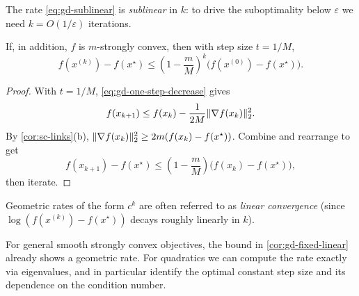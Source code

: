 The rate \eqref{eq:gd-sublinear} is \emph{sublinear} in $k$: to drive the suboptimality below $\varepsilon$ we need $k=O(1/\varepsilon)$ iterations.

\begin{corollary}
\label{cor:gd-fixed-linear}
If, in addition, $f$ is $m$-strongly convex, then with step size $t=1/M$,
\begin{equation}
  f(x^{(k)})-f(x^\star)
  \le \left(1-\frac{m}{M}\right)^k\bigl(f(x^{(0)})-f(x^\star)\bigr).
  \label{eq:gd-fixed-linear}
\end{equation}
\end{corollary}
\begin{proof}
With $t=1/M$, \eqref{eq:gd-one-step-decrease} gives
\[
  f(x_{k+1}) \le f(x_k) - \frac{1}{2M}\lVert\nabla f(x_k)\rVert_2^2.
\]
By \cref{cor:sc-links}(b), $\lVert\nabla f(x_k)\rVert_2^2 \ge 2m(f(x_k)-f(x^\star))$.
Combine and rearrange to get
\[
  f(x_{k+1})-f(x^\star) \le \left(1-\frac{m}{M}\right)\bigl(f(x_k)-f(x^\star)\bigr),
\]
then iterate.
\end{proof}

Geometric rates of the form $c^k$ are often referred to as \emph{linear convergence} (since $\log(f(x^{(k)})-f(x^\star))$ decays roughly linearly in $k$).

For general smooth strongly convex objectives, the bound in \cref{cor:gd-fixed-linear} already shows a geometric rate.
For quadratics we can compute the rate exactly via eigenvalues, and in particular identify the optimal constant step size and its dependence on the condition number.

